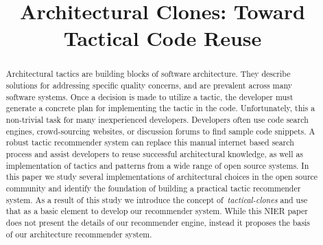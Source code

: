\documentclass[conference]{IEEEtran}
\begin{document}
%
\title{Architectural Clones: Toward Tactical Code Reuse}

\author{
}








\maketitle


\begin{abstract}

Architectural tactics are building blocks of software architecture. They describe solutions for addressing specific quality concerns, and are prevalent across many software systems. Once a decision is made to utilize a tactic, the developer must generate a concrete plan for implementing the tactic in the code. Unfortunately, this a non-trivial task for many inexperienced developers. Developers often use code search engines, crowd-sourcing websites, or discussion forums to find sample code snippets. A robust tactic recommender system can replace this manual internet based search process and assist developers to reuse successful architectural knowledge, as well as implementation of tactics and patterns  from a wide range of open source systems. In this paper we study several implementations of architectural choices in the open source community and identify the foundation of building a practical tactic recommender system. As a result of this study we introduce the concept of~\emph{tactical-clones} and use that as a basic element to develop our recommender system. While this NIER paper does not present the details of our recommender engine, instead it proposes the basis of our architecture recommender system.

\end{abstract}
\end{document}

